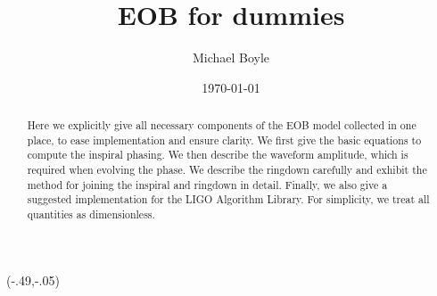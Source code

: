 \documentclass[twoside, aps, prd, letterpaper, noshowpacs, %
amsmath, amssymb, amsfonts, nofootinbib, floatfix, notitlepage]%
{revtex4-1}
\begin{document}



\title[EOB for dummies] {EOB for dummies}


\author{Michael Boyle} \Cornell

\begin{abstract}
  Here we explicitly give all necessary components of the EOB model
  collected in one place, to ease implementation and ensure clarity.
  We first give the basic equations to compute the inspiral phasing.
  We then describe the waveform amplitude, which is required when
  evolving the phase.  We describe the ringdown carefully and exhibit
  the method for joining the inspiral and ringdown in detail.
  Finally, we also give a suggested implementation for the LIGO
  Algorithm Library.  For simplicity, we treat all quantities as
  dimensionless.
\end{abstract}

\date{\today}



\maketitle



\begin{textblock}{1}(-.49,-.05)
\end{textblock}
\end{document}
